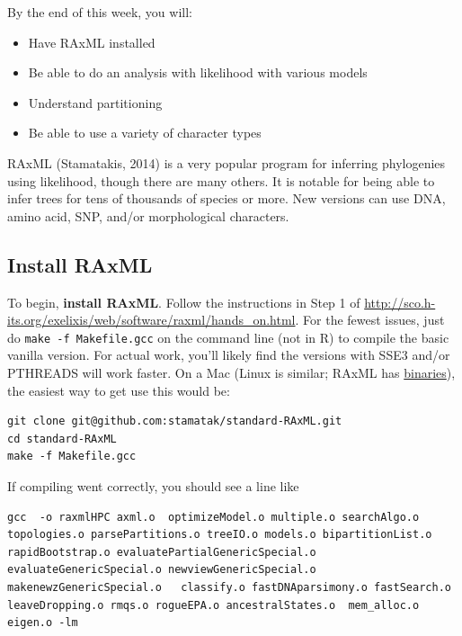 \documentclass[]{article}
\providecommand{\tightlist}{%
  \setlength{\itemsep}{0pt}\setlength{\parskip}{0pt}}
\theoremstyle{definition}
\theoremstyle{definition}
\theoremstyle{definition}
\theoremstyle{remark}
\begin{document}
By the end of this week, you will:

\begin{itemize}
\tightlist
\item
  Have RAxML installed
\item
  Be able to do an analysis with likelihood with various models
\item
  Understand partitioning
\item
  Be able to use a variety of character types
\end{itemize}

RAxML (Stamatakis, 2014) is a very popular program for inferring
phylogenies using likelihood, though there are many others. It is
notable for being able to infer trees for tens of thousands of species
or more. New versions can use DNA, amino acid, SNP, and/or morphological
characters.

\hypertarget{install-raxml}{%
\subsection{Install RAxML}\label{install-raxml}}

To begin, \textbf{install RAxML}. Follow the instructions in Step 1 of
\url{http://sco.h-its.org/exelixis/web/software/raxml/hands_on.html}.
For the fewest issues, just do \texttt{make\ -f\ Makefile.gcc} on the
command line (not in R) to compile the basic vanilla version. For actual
work, you'll likely find the versions with SSE3 and/or PTHREADS will
work faster. On a Mac (Linux is similar; RAxML has
\href{https://github.com/stamatak/standard-RAxML/tree/master/WindowsExecutables_v8.2.4}{binaries}),
the easiest way to get use this would be:

\begin{verbatim}
git clone git@github.com:stamatak/standard-RAxML.git
cd standard-RAxML
make -f Makefile.gcc
\end{verbatim}

If compiling went correctly, you should see a line like

\begin{verbatim}
gcc  -o raxmlHPC axml.o  optimizeModel.o multiple.o searchAlgo.o topologies.o parsePartitions.o treeIO.o models.o bipartitionList.o rapidBootstrap.o evaluatePartialGenericSpecial.o evaluateGenericSpecial.o newviewGenericSpecial.o makenewzGenericSpecial.o   classify.o fastDNAparsimony.o fastSearch.o leaveDropping.o rmqs.o rogueEPA.o ancestralStates.o  mem_alloc.o  eigen.o -lm
\end{verbatim}
\end{document}
